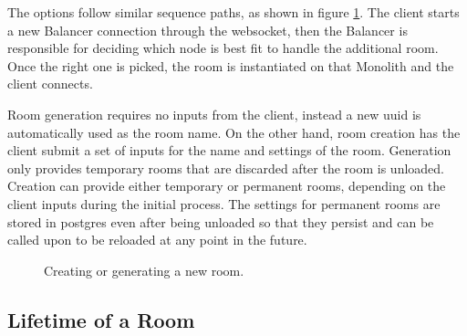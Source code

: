 The options follow similar sequence paths, as shown in figure \ref{Figure::create-room-diag}. The client starts a new Balancer connection through the websocket, then the Balancer is responsible for deciding which node is best fit to handle the additional room. Once the right one is picked, the room is instantiated on that Monolith and the client connects.

Room generation requires no inputs from the client, instead a new uuid is automatically used as the room name. On the other hand, room creation has the client submit a set of inputs for the name and settings of the room. Generation only provides temporary rooms that are discarded after the room is unloaded. Creation can provide either temporary or permanent rooms, depending on the client inputs during the initial process. The settings for permanent rooms are stored in postgres even after being unloaded so that they persist and can be called upon to be reloaded at any point in the future.

\begin{figure}[!htb]
  \centering
  \caption{\label{Figure::create-room-diag} Creating or generating a new room.}
\end{figure}

\subsection{Lifetime of a Room}

